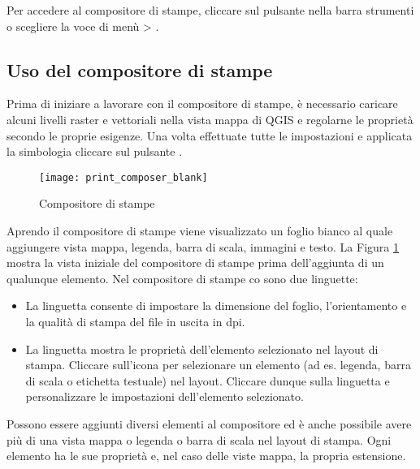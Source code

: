 Per accedere al compositore di stampe, cliccare sul pulsante
 nella barra strumenti o scegliere la voce
di menù  > .

\subsection{Uso del compositore di stampe}\label{label_useprintcomposer} 

Prima di iniziare a lavorare con il compositore di stampe, è necessario
caricare alcuni livelli raster e vettoriali nella vista mappa di QGIS e
regolarne le proprietà secondo le proprie esigenze. Una volta effettuate
tutte le impostazioni e applicata la simbologia cliccare sul pulsante
.

\begin{figure}[ht]
   \begin{center}
   \caption{Compositore di stampe \nixcaption}\label{fig:print_composer_blank}\smallskip
   \texttt{[image: print\_composer\_blank]}
\end{center}  
\end{figure}

Aprendo il compositore di stampe viene visualizzato un foglio bianco al quale
aggiungere vista mappa, legenda, barra di scala, immagini e testo. La Figura
\ref{fig:print_composer_blank} mostra la vista iniziale del compositore di
stampe prima dell'aggiunta di un qualunque elemento. Nel compositore di stampe
co sono due linguette:

\begin{itemize}
\item La linguetta  consente di impostare la dimensione del
foglio, l'orientamento e la qualità di stampa del file in uscita in dpi.
\item La linguetta  mostra le proprietà dell'elemento selezionato
nel layout di stampa. 
Cliccare sull'icona  
per selezionare un elemento (ad es. legenda, barra di scala o etichetta
testuale) nel layout. Cliccare dunque sulla linguetta  e
personalizzare le impostazioni dell'elemento selezionato.
\end{itemize}

Possono essere aggiunti diversi elementi al compositore ed è anche
possibile avere più di una vista mappa o legenda o barra di scala nel layout
di stampa. Ogni elemento ha le sue proprietà e, nel caso delle viste mappa, la
propria estensione.

